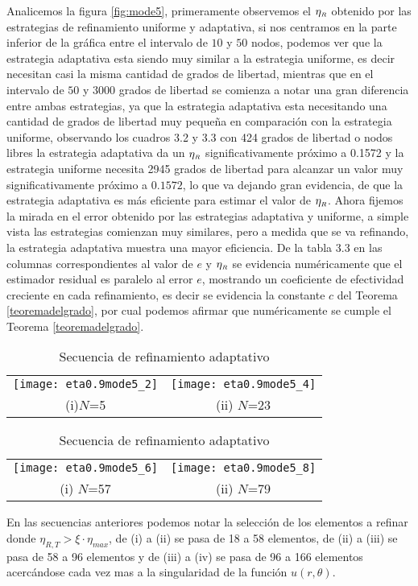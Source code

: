 Analicemos la figura \ref{fig:mode5}, primeramente observemos el $\eta_{\text{\tiny $R$}}$ obtenido por las estrategias de refinamiento  uniforme y adaptativa, si nos centramos en la parte inferior de la gr\'afica entre el intervalo de $10$ y $50$ nodos, podemos ver que la estrategia adaptativa esta siendo muy similar a la  estrategia uniforme, es decir necesitan casi la misma cantidad de grados de libertad, mientras que en el intervalo de $50$  y $3000$ grados de libertad se comienza a notar una gran diferencia entre ambas estrategias, ya que la estrategia adaptativa esta necesitando una cantidad de grados de libertad muy peque\~na en comparaci\'on con la estrategia uniforme, observando los cuadros {\rm 3.2} y {\rm 3.3} con 424 grados de libertad o nodos libres la estrategia adaptativa da un $\eta_{\text{\tiny $R$}}$  significativamente pr\'oximo a 0.1572 y la estrategia uniforme necesita 2945 grados de libertad para alcanzar un valor muy significativamente pr\'oximo a $0.1572$, lo que va dejando gran evidencia, de que la estrategia adaptativa es m\'as eficiente para estimar el valor de $\eta_{\text{\tiny  $R$}}$. Ahora fijemos la mirada en el error obtenido por las estrategias adaptativa y uniforme, a simple vista las estrategias comienzan muy similares, pero a medida que se va refinando, la estrategia adaptativa muestra una mayor eficiencia. 
De la tabla {\rm 3.3} en las columnas correspondientes al valor de $e$ y $\eta_{\text{\tiny  $R$}}$ se evidencia num\'ericamente que el estimador residual es paralelo al  error $e$, mostrando un coeficiente de efectividad creciente en cada refinamiento, es decir se evidencia la constante $c$ del Teorema \ref{teoremadelgrado}, por cual podemos afirmar que num\'ericamente se cumple el Teorema \ref{teoremadelgrado}.
\newpage

\begin{table}[h!]
	\begin{center}
		\begin{tabular}{c c}
			\texttt{[image: eta0.9mode5\_2]}
			&\texttt{[image: eta0.9mode5\_4]}\\
			{\rm (i)}$N$=5  & {\rm (ii)} $N$=23
		\end{tabular}
	\end{center}
	\begin{center}
		\begin{tabular}{c c}
			\texttt{[image: eta0.9mode5\_6]}
			&\texttt{[image: eta0.9mode5\_8]} \\
			{\rm (i)} $N$=57 & {\rm (ii)} $N$=79
		\end{tabular}
		\caption{Secuencia de refinamiento adaptativo}
	\end{center}
\end{table}

En las secuencias anteriores podemos notar la selecci\'on de los elementos a refinar donde $\eta_{R,T}>\xi\cdot \eta_{max}$, de {\rm (i)}  a {\rm (ii)} se pasa de 18 a 58 elementos, de {\rm (ii)}  a {\rm (iii)}  se pasa de 58 a 96 elementos y de {\rm (iii)}  a {\rm (iv)} se pasa de 96 a 166 elementos acerc\'andose cada vez mas a la singularidad de la funci\'on $u(r,\theta)$.


